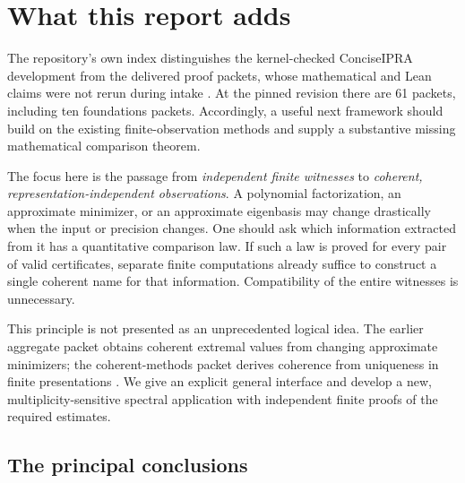 \section{What this report adds}
\label{sec:scope}

The repository's own index distinguishes the kernel-checked ConciseIPRA development from the delivered proof packets, whose mathematical and Lean claims were not rerun during intake \cite{repoindex,packetindex}. At the pinned revision there are 61 packets, including ten foundations packets. Accordingly, a useful next framework should build on the existing finite-observation methods and supply a substantive missing mathematical comparison theorem.

The focus here is the passage from \emph{independent finite witnesses} to \emph{coherent, representation-independent observations}. A polynomial factorization, an approximate minimizer, or an approximate eigenbasis may change drastically when the input or precision changes. One should ask which information extracted from it has a quantitative comparison law. If such a law is proved for every pair of valid certificates, separate finite computations already suffice to construct a single coherent name for that information. Compatibility of the entire witnesses is unnecessary.

This principle is not presented as an unprecedented logical idea. The earlier aggregate packet obtains coherent extremal values from changing approximate minimizers; the coherent-methods packet derives coherence from uniqueness in finite presentations \cite{aggregates,coherent}. We give an explicit general interface and develop a new, multiplicity-sensitive spectral application with independent finite proofs of the required estimates.

\subsection{The principal conclusions}

